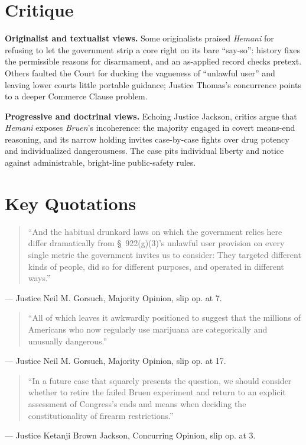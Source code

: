 \documentclass[12pt]{article}
\begin{document}
\section{Critique}

\textbf{Originalist and textualist views.} Some originalists praised \textit{Hemani} for refusing to let the government strip a core right on its bare ``say-so'': history fixes the permissible reasons for disarmament, and an as-applied record checks pretext. Others faulted the Court for ducking the vagueness of ``unlawful user'' and leaving lower courts little portable guidance; Justice Thomas's concurrence points to a deeper Commerce Clause problem.

\textbf{Progressive and doctrinal views.} Echoing Justice Jackson, critics argue that \textit{Hemani} exposes \textit{Bruen}'s incoherence: the majority engaged in covert means-end reasoning, and its narrow holding invites case-by-case fights over drug potency and individualized dangerousness. The case pits individual liberty and notice against administrable, bright-line public-safety rules.

\section{Key Quotations}

\begin{quote}
``And the habitual drunkard laws on which the government relies here differ dramatically from \S~922(g)(3)'s unlawful user provision on every single metric the government invites us to consider: They targeted different kinds of people, did so for different purposes, and operated in different ways.''
\end{quote}
\noindent --- Justice Neil M. Gorsuch, Majority Opinion, slip op. at 7.

\begin{quote}
``All of which leaves it awkwardly positioned to suggest that the millions of Americans who now regularly use marijuana are categorically and unusually dangerous.''
\end{quote}
\noindent --- Justice Neil M. Gorsuch, Majority Opinion, slip op. at 17.

\begin{quote}
``In a future case that squarely presents the question, we should consider whether to retire the failed Bruen experiment and return to an explicit assessment of Congress's ends and means when deciding the constitutionality of firearm restrictions.''
\end{quote}
\noindent --- Justice Ketanji Brown Jackson, Concurring Opinion, slip op. at 3.
\end{document}
